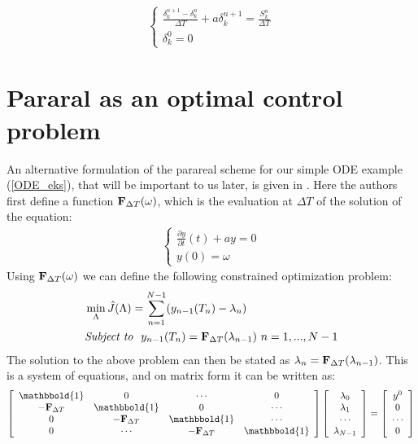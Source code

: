 \begin{align}
\left\{
     \begin{array}{lr}
		\frac{\delta_k^{n+1}-\delta_k^{n}}{\Delta T}+a\delta_k^{n+1}=\frac{S_k ^n}{\Delta T}  \\
		\delta_k^0=0
	\end{array}
\right. \label{propagator}
\end{align}
\section{Pararal as an optimal control problem}
An alternative formulation of the parareal scheme for our simple ODE example (\ref{ODE_eks}), that will be important to us later, is given in \cite{maday2002parareal}. Here the authors first define a function $\bold F_{\Delta T}(\omega)$, which is the evaluation at $\Delta T$ of the solution of the equation:
\begin{align}
\left\{
     \begin{array}{lr}
		\frac{\partial y}{\partial t}(t)+ay=0  \\
		y(0)=\omega
	\end{array} 
\right. \label{F_operator}
\end{align}
Using $\bold F_{\Delta T}(\omega)$ we can define the following constrained optimization problem:
\begin{align*}
&\min_{\Lambda}\hat{J}(\Lambda) = \sum_{n=1}^{N-1} (y_{n-1}(T_{n})-\lambda_{n}) \\
&\textit{Subject to } \ y_{n-1}(T_{n}) = \bold F_{\Delta T}(\lambda_{n-1}) \ n=1,...,N-1
\end{align*}
The solution to the above problem can then be stated as $\lambda_n = \bold{F}_{\Delta T}(\lambda_{n-1})$. This is a system of equations, and on matrix form it can be written as:
\begin{align}
  \left[ \begin{array}{cccc}
   \mathbbold{1} & 0 & \cdots & 0 \\  
   -\bold{F}_{\Delta T} & \mathbbold{1} & 0 & \cdots \\ 
   0 &-\bold{F}_{\Delta T} & \mathbbold{1}  & \cdots \\
   0 &\cdots &-\bold{F}_{\Delta T} & \mathbbold{1}  \\
   \end{array}  \right] 
   \left[ \begin{array}{c}
   \lambda_0 \\
   \lambda_1 \\
   \cdots \\
   \lambda_{N-1} \\
   \end{array}  \right] =
   \left[ \begin{array}{c}
   y^0 \\
   0 \\
   \cdots \\
   0 \\
   \end{array}  \right]
\end{align}
